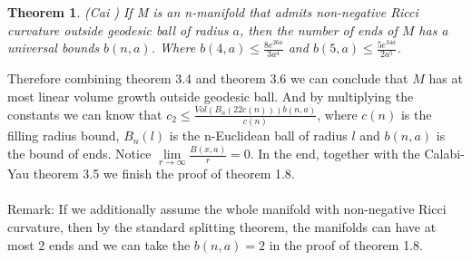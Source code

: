\documentclass{amsart}
\newtheorem{theorem}{Theorem}[section]
\theoremstyle{definition}
\theoremstyle{remark}
\numberwithin{equation}{section}
\begin{document}
\begin{theorem}(Cai \cite{c91})
    If M is an n-manifold that admits non-negative Ricci curvature outside geodesic ball of radius $a$, then the number of ends of $M$ has a universal bounds $b(n,a)$. Where $b(4,a)\leq \frac{8e^{26a}}{3a^{4}}$ and $b(5,a)\leq \frac{5e^{34a}}{2a^{5}}$.
\end{theorem}


Therefore combining theorem 3.4 and theorem 3.6 we can conclude that $M$ has at most linear volume growth outside geodesic ball. And by multiplying the constants we can know that $c_{2}\leq \frac{Vol(B_{n}(22c(n)))b(n,a)}{c(n)}$, where $c(n)$ is the filling radius bound, $B_n(l)$ is the n-Euclidean ball of radius $l$ and $b(n,a)$ is the bound of ends. Notice $\lim\limits_{r\to \infty}\frac{B(x,a)}{r}=0$. In the end, together with the Calabi-Yau theorem 3.5 we finish the proof of theorem 1.8.
\\
\\
Remark: If we additionally assume the whole manifold with non-negative Ricci curvature, then by the standard splitting theorem, the manifolds can have at most 2 ends and we can take the $b(n,a)=2$ in the proof of theorem 1.8. 


\end{document}
